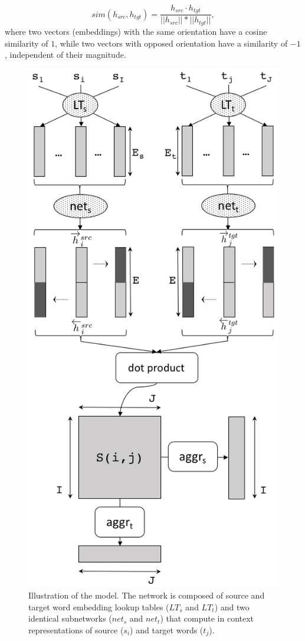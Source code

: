 \documentclass[11pt,a4paper]{article}
\begin{document}
\begin{equation}
    sim(h_{src}, h_{tgt}) = \frac{h_{src} \cdotp h_{tgt}}{||h_{src}|| * ||h_{tgt}||},
    \label{cosine}
\end{equation}
\noindent where two vectors (embeddings) with the same orientation have a cosine similarity of $1$, while two vectors with opposed orientation have a similarity of $-1$, independent of their magnitude.

\begin{figure}[h]
\center
    \includegraphics[width=1.0\linewidth]{network}
    \caption{Illustration of the model. The network is composed of source and target word embedding lookup tables ($LT_s$ and $LT_t$) and two identical subnetworks ($net_s$ and $net_t$) that compute in context representations of source ($s_i$) and target words ($t_j$).} 
    \label{network}
\end{figure}
\end{document}
